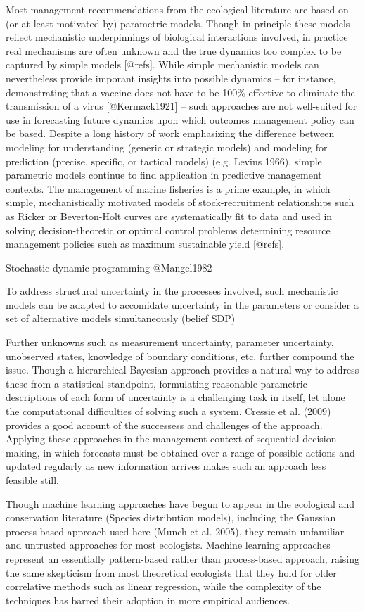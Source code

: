 \documentclass[author-year, review]{elsarticle} %
\begin{document}
Most management recommendations from the ecological literature are based
on (or at least motivated by) parametric models. Though in principle
these models reflect mechanistic underpinnings of biological
interactions involved, in practice real mechanisms are often unknown and
the true dynamics too complex to be captured by simple models
{[}@refs{]}. While simple mechanistic models can nevertheless provide
imporant insights into possible dynamics -- for instance, demonstrating
that a vaccine does not have to be 100\% effective to eliminate the
transmission of a virus {[}@Kermack1921{]} -- such approaches are not
well-suited for use in forecasting future dynamics upon which outcomes
management policy can be based. Despite a long history of work
emphasizing the difference between modeling for understanding (generic
or strategic models) and modeling for prediction (precise, specific, or
tactical models) (e.g. Levins 1966), simple parametric models continue
to find application in predictive management contexts. The management of
marine fisheries is a prime example, in which simple, mechanistically
motivated models of stock-recruitment relationships such as Ricker or
Beverton-Holt curves are systematically fit to data and used in solving
decision-theoretic or optimal control problems determining resource
management policies such as maximum sustainable yield {[}@refs{]}.

Stochastic dynamic programming @Mangel1982

To address structural uncertainty in the processes involved, such
mechanistic models can be adapted to accomidate uncertainty in the
parameters or consider a set of alternative models simultaneously
(belief SDP)

Further unknowns such as measurement uncertainty, parameter uncertainty,
unobserved states, knowledge of boundary conditions, etc. further
compound the issue. Though a hierarchical Bayesian approach provides a
natural way to address these from a statistical standpoint, formulating
reasonable parametric descriptions of each form of uncertainty is a
challenging task in itself, let alone the computational difficulties of
solving such a system. Cressie et al. (2009) provides a good account of
the successess and challenges of the approach. Applying these approaches
in the management context of sequential decision making, in which
forecasts must be obtained over a range of possible actions and updated
regularly as new information arrives makes such an approach less
feasible still.

Though machine learning approaches have begun to appear in the
ecological and conservation literature (Species distribution models),
including the Gaussian process based approach used here (Munch et al.
2005), they remain unfamiliar and untrusted approaches for most
ecologists. Machine learning approaches represent an essentially
pattern-based rather than process-based approach, raising the same
skepticism from most theoretical ecologists that they hold for older
correlative methods such as linear regression, while the complexity of
the techniques has barred their adoption in more empirical audiences.
\end{document}
